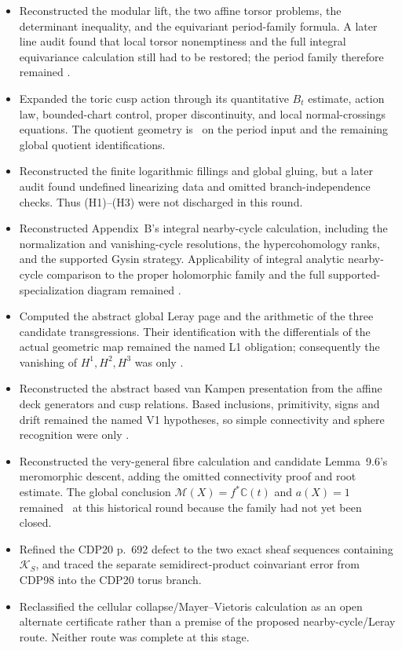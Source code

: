 \begin{itemize}[leftmargin=1.8em]
\item Reconstructed the modular lift, the two affine torsor problems, the
determinant inequality, and the equivariant period-family formula.  A later
line audit found that local torsor nonemptiness and the full integral
equivariance calculation still had to be restored; the period family
therefore remained \Open.
\item Expanded the toric cusp action through its quantitative $B_t$
estimate, action law, bounded-chart control, proper discontinuity, and local
normal-crossings equations.  The quotient geometry is \Conditional\ on the
period input and the remaining global quotient identifications.
\item Reconstructed the finite logarithmic fillings and global gluing, but a
later audit found undefined linearizing data and omitted branch-independence
checks.  Thus (H1)--(H3) were not discharged in this round.
\item Reconstructed Appendix~B's integral nearby-cycle calculation,
including the normalization and vanishing-cycle resolutions, the
hypercohomology ranks, and the supported Gysin strategy.  Applicability of
integral analytic nearby-cycle comparison to the proper holomorphic family
and the full supported-specialization diagram remained \Open.
\item Computed the abstract global Leray page and the arithmetic of the three
candidate transgressions.  Their identification with the differentials of
the actual geometric map remained the named L1 obligation; consequently the
vanishing of $H^1,H^2,H^3$ was only \Conditional.
\item Reconstructed the abstract based van Kampen presentation from the
affine deck generators and cusp relations.  Based inclusions, primitivity,
signs and drift remained the named V1 hypotheses, so simple connectivity and
sphere recognition were only \Conditional.
\item Reconstructed the very-general fibre calculation and candidate
Lemma~9.6's meromorphic descent, adding the omitted connectivity proof and
root estimate.  The global conclusion
$\mathcal M(X)=f^*\mathbb C(t)$ and $a(X)=1$ remained
\Conditional\ at this historical round because the family had not yet been
closed.
\item Refined the CDP20 p.~692 defect to the two exact sheaf sequences
containing $\mathscr K_S$, and traced the separate semidirect-product
coinvariant error from CDP98 into the CDP20 torus branch.
\item Reclassified the cellular collapse/Mayer--Vietoris calculation as an
open alternate certificate rather than a premise of the proposed
nearby-cycle/Leray route.  Neither route was complete at this stage.
\end{itemize}

